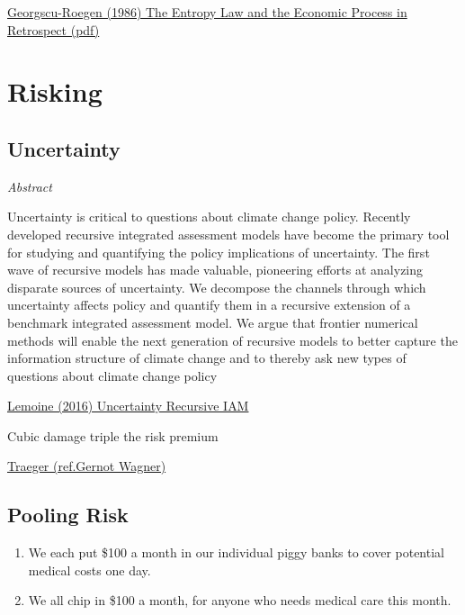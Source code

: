 \documentclass[
]{book}
\begin{document}
\href{pdf/Georgescu-Roegen_1986_Entropy_Retrospect.pdf}{Georgscu-Roegen (1986) The Entropy Law and the Economic Process in Retrospect (pdf)}

\hypertarget{risking}{%
\chapter{Risking}\label{risking}}

\hypertarget{uncertainty}{%
\section{Uncertainty}\label{uncertainty}}

\emph{Abstract}

Uncertainty is critical to questions about climate change policy.
Recently developed recursive integrated assessment models have become
the primary tool for studying and quantifying the policy implications of uncertainty.
The first wave of recursive models has made valuable, pioneering efforts at
analyzing disparate sources of uncertainty.
We decompose the channels through which uncertainty affects policy and quantify
them in a recursive extension of a benchmark integrated assessment model.
We argue that frontier numerical methods will enable the next generation of
recursive models to better capture the information structure of
climate change and to thereby ask new types of questions about climate change policy

\href{pdf/Lemoine_2016_Climate_Uncertainty_Recursive_IAM.pdf}{Lemoine (2016) Uncertainty Recursive IAM}

Cubic damage triple the risk premium

\href{https://www.frbsf.org/economic-research/events/2021/february/christian-traeger-uncertainty-and-climate-change/}{Traeger (ref.Gernot Wagner)}

\hypertarget{pooling-risk}{%
\section{Pooling Risk}\label{pooling-risk}}

\begin{enumerate}
\def\labelenumi{\Alph{enumi})}
\item
  We each put \$100 a month in our individual piggy banks to cover potential medical costs one day.
\item
  We all chip in \$100 a month, for anyone who needs medical care this month.
\end{enumerate}
\end{document}
